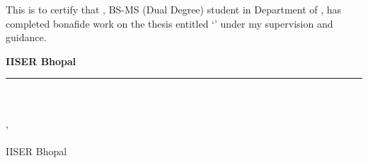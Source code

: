\par This is to certify that \mystudentname, BS-MS (Dual Degree) student in
Department of \mydepartmentname, has completed bonafide work on the thesis entitled `\textbf{\mythesistitle}' under my supervision and guidance.

\vspace{7em}

\noindent
\begin{minipage}[t]{0.45\textwidth}
	\centering
	\vspace{1em}
	\textbf{IISER Bhopal}
\end{minipage}
\hfill
\begin{minipage}[t]{0.5\textwidth}
	\raggedright
	\rule{6cm}{0.5pt} \\ %
	\textbf{\mysupervisorname} \\ %
	\mysupervisordesig, \\
	\mydepartmentname \\
	IISER Bhopal
\end{minipage}

\vspace{2.5em}

\printcommittee{}


